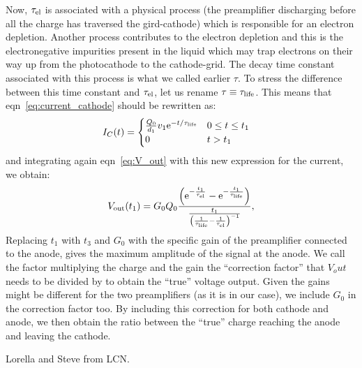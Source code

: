 \documentclass[a4paper,11pt]{article}
\providecommand*{\eu}%
{\ensuremath{\mathrm{e}}}
\begin{document}
Now, $\tau_{\rm el}$ is associated with a physical process (the preamplifier discharging before all the charge has traversed the gird-cathode) which is responsible for an electron depletion. Another process contributes to the electron depletion and this is the electronegative impurities present in the liquid which may trap electrons on their way up from the photocathode to the cathode-grid. The decay time constant associated with this process is what we called earlier $\tau$. To stress the difference between this time constant and $\tau_{\rm el}$, let us rename $\tau \equiv \tau_{\rm life}$.
This means that eqn~\ref{eq:current_cathode} should be rewritten as:
\begin{align}
 I_C(t) &=
  \begin{cases}
   \frac{Q_0}{d_1}v_{1} \eu^{-t/\tau_{\rm life}}  
                            & 0 \leq t \leq t_{1} \\
   0        			    & t > t_{1}
  \end{cases}
  \label{eq:current_cathode}
\end{align}
and integrating again eqn~\ref{eq:V_out} with this new expression for the current, we obtain:
\begin{equation}
V_{\rm out}(t_1) = G_0 Q_0 \frac{
\left(\eu^{-\frac{t_1}{\tau_{\rm el}}}-\eu^{-\frac{t_1}{\tau_{\rm life}}}\right)
}{
\frac{t_{1}}{\left (\frac{1}{\tau_{\rm life}}-\frac{1}{\tau_{\rm el}}\right )^{-1}}
},
\end{equation}
Replacing $t_1$ with $t_3$ and $G_0$ with the specific gain of the preamplifier connected to the anode, gives the maximum amplitude of the signal at the anode. 
We call the factor multiplying the charge and the gain the ``correction factor'' that $V_out$ needs to be divided by to obtain the ``true'' voltage output. Given the gains might be different for the two preamplifiers (as it is in our case), we include $G_0$ in the correction factor too. By including this correction for both cathode and anode, we then obtain the ratio between the ``true'' charge reaching the anode and leaving the cathode. 

\acknowledgments
Lorella and Steve from LCN.


\begingroup
    \setlength{\bibsep}{10pt}
    
\endgroup
\end{document}
